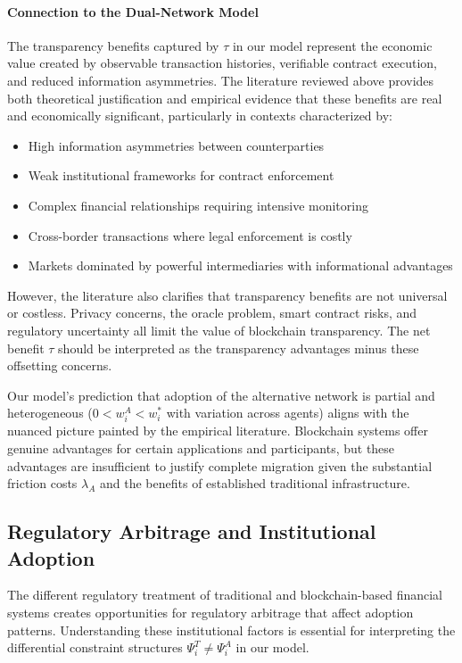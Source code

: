 \paragraph{Connection to the Dual-Network Model}

The transparency benefits captured by $\tau$ in our model represent the economic value created by observable transaction histories, verifiable contract execution, and reduced information asymmetries. The literature reviewed above provides both theoretical justification and empirical evidence that these benefits are real and economically significant, particularly in contexts characterized by:

\begin{itemize}
    \item High information asymmetries between counterparties
    \item Weak institutional frameworks for contract enforcement
    \item Complex financial relationships requiring intensive monitoring
    \item Cross-border transactions where legal enforcement is costly
    \item Markets dominated by powerful intermediaries with informational advantages
\end{itemize}

However, the literature also clarifies that transparency benefits are not universal or costless. Privacy concerns, the oracle problem, smart contract risks, and regulatory uncertainty all limit the value of blockchain transparency. The net benefit $\tau$ should be interpreted as the transparency advantages minus these offsetting concerns.

Our model's prediction that adoption of the alternative network is partial and heterogeneous ($0 < w_i^A < w_i^*$ with variation across agents) aligns with the nuanced picture painted by the empirical literature. Blockchain systems offer genuine advantages for certain applications and participants, but these advantages are insufficient to justify complete migration given the substantial friction costs $\lambda_A$ and the benefits of established traditional infrastructure.

\subsection{Regulatory Arbitrage and Institutional Adoption}

The different regulatory treatment of traditional and blockchain-based financial systems creates opportunities for regulatory arbitrage that affect adoption patterns. Understanding these institutional factors is essential for interpreting the differential constraint structures $\Psi_i^T \neq \Psi_i^A$ in our model.

